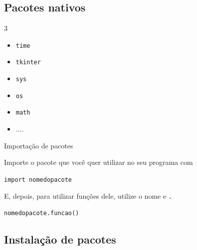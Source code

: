 	\subsection{Pacotes nativos}
	
	\begin{frame}
		\begin{multicols}{3}
			
			\begin{itemize}
				\item \texttt{time}
				\item \texttt{tkinter}
				
				\vfill 
				 
				\item \texttt{sys}									 				
				\item \texttt{os}	
				
				\vfill 
				
				 
				\item \texttt{math} 					
				
				\item ....
				
			\end{itemize}
		\end{multicols}
		
		\vfill \hfill 
	\end{frame}	
	
	\begin{frame}{Importação de pacotes}
		
		Importe o pacote que você quer utilizar no seu programa com 
		
		\texttt{import nomedopacote}
		
		E, depois, para utilizar funções dele, utilize o nome e \texttt{.}
		
		\texttt{nomedopacote.funcao()}
	\end{frame}
	
	\subsection{Instalação de pacotes}
	

